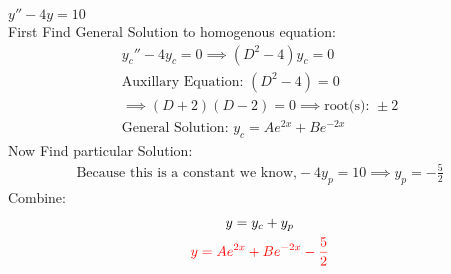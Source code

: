 \item [1.] $y''-4y=10$\\[2mm]
First Find General Solution to homogenous equation:
\begin{gather*}
    y_c''-4y_c=0 \implies (D^2-4)y_c=0\\
    \text{Auxillary Equation: }(D^2-4)=0\\
    \implies (D+2)(D-2)=0 \implies \text{root(s): } \pm 2\\
    \text{General Solution: } y_c=Ae^{2x}+Be^{-2x}
\end{gather*}
Now Find particular Solution:
\begin{gather*}
    \text{Because this is a constant we know,} -4y_p = 10
    \implies y_p = -\frac{5}{2}
\end{gather*}
Combine:
\begin{gather*}
    y=y_c+y_p\\
    \textcolor{red}{y = Ae^{2x}+Be^{-2x}-\frac{5}{2}}
\end{gather*}